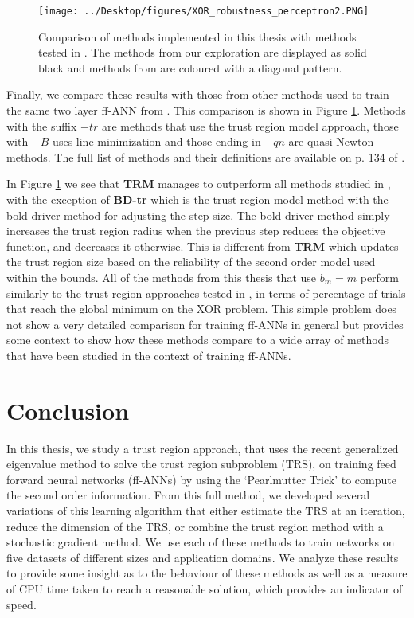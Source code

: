 \documentclass[letterpaper,12pt,titlepage,oneside,final]{book}
\begin{document}
	\begin{figure}[h]
		\centering
		\texttt{[image: ../Desktop/figures/XOR\_robustness\_perceptron2.PNG]}
		\caption{Comparison of methods implemented in this thesis with methods tested in \cite{Shepherd.1997}. The methods from our exploration are displayed as solid black and methods from \cite{Shepherd.1997} are coloured with a diagonal pattern.}
		\label{figure:XOR_comparison}
	\end{figure}
	Finally, we compare these results with those from other methods used to train the same two layer ff-ANN from \cite{Shepherd.1997}. This comparison is shown in Figure \ref{figure:XOR_comparison}. Methods with the suffix $-tr$ are methods that use the trust region model approach, those with $-B$ uses line minimization and those ending in $-qn$ are quasi-Newton methods. The full list of methods and their definitions are available on p. 134 of \cite{Shepherd.1997}.
	
	In Figure \ref{figure:XOR_comparison} we see that \textbf{TRM} manages to outperform all methods studied in \cite{Shepherd.1997}, with the exception of \textbf{BD-tr} which is the trust region model method with the bold driver method for adjusting the step size. The bold driver method simply increases the trust region radius when the previous step reduces the objective function, and decreases it otherwise. This is different from \textbf{TRM} which updates the trust region size based on the reliability of the second order model used within the bounds. All of the methods from this thesis that use $b_{m} = m$ perform similarly to the trust region approaches tested in \cite{Shepherd.1997}, in terms of percentage of trials that reach the global minimum on the XOR problem. This simple problem does not show a very detailed comparison for training ff-ANNs in general but provides some context to show how these methods compare to a wide array of methods that have been studied in the context of training ff-ANNs. 
	
	\chapter{Conclusion}
	
	In this thesis, we study a trust region approach, that uses the recent generalized eigenvalue method to solve the trust region subproblem (TRS), on training feed forward neural networks (ff-ANNs) by using the `Pearlmutter Trick' to compute the second order information. From this full method, we developed several variations of this learning algorithm that either estimate the TRS at an iteration, reduce the dimension of the TRS, or combine the trust region method with a stochastic gradient method. We use each of these methods to train networks on five datasets of different sizes and application domains. We analyze these results to provide some insight as to the behaviour of these methods as well as a measure of CPU time taken to reach a reasonable solution, which provides an indicator of speed.
	
\end{document}
